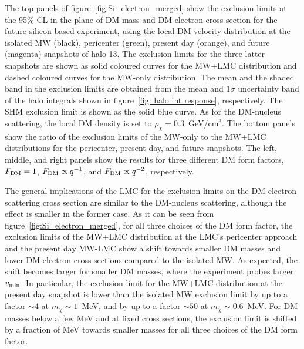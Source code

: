 The top panels of figure~\ref{fig:Si_electron_merged} show the exclusion limits at the 95\% CL in the plane of DM mass and DM-electron cross section for the future silicon based experiment, using the local DM velocity distribution at the isolated MW (black), pericenter (green), present day (orange), and future (magenta) snapshots of halo 13. The exclusion limits for the three latter snapshots are shown as
solid coloured curves for the MW+LMC distribution and dashed coloured curves for the MW-only distribution.  The mean and the
shaded band in the exclusion limits are obtained from the mean and $1\sigma$ uncertainty band of
the halo integrals shown in figure~\ref{fig: halo int response}, respectively. The SHM exclusion limit is shown as the solid blue curve. As for the DM-nucleus scattering, the local
DM density is set to $\rho_\chi = 0.3$~GeV/cm$^3$. The bottom panels show the ratio of the exclusion limits of the MW-only  to the MW+LMC distributions for the pericenter, present day, and future snapshots. The left, middle, and right panels show the results for three different DM  form factors, $F_{\rm{DM}}=1$, $F_{\rm{DM}} \propto q^{-1}$, and $F_{\rm{DM}} \propto q^{-2}$, respectively.

The general implications of the LMC for the exclusion limits on the DM-electron scattering cross section are similar to the DM-nucleus scattering, although the effect is smaller in the former case. As it can be seen from figure~\ref{fig:Si_electron_merged}, for all three choices of the DM form factor, the exclusion limits of the MW+LMC distribution at the LMC's pericenter approach and the present day MW-LMC show a shift towards smaller DM masses and lower DM-electron cross sections compared to the isolated MW. As expected, the shift becomes larger for smaller DM masses, where the experiment probes larger $v_{\rm min}$. In particular, the exclusion limit for the MW+LMC distribution at the present day snapshot is lower than the isolated MW exclusion limit by up to a factor $\sim 4$ at $m_\chi \sim 1$~MeV, and by up to a factor $\sim 50$ at $m_\chi \sim 0.6$~MeV. For DM masses below a few MeV and at fixed cross sections, the exclusion limit is shifted by a fraction of MeV towards smaller masses for all three choices of the DM form factor.






